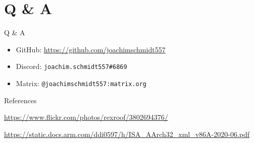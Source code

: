 \documentclass{beamer}
\begin{document}
\section{Q \& A}

\begin{frame}{Q \& A}
    \begin{itemize}
        \item GitHub: \url{https://github.com/joachimschmidt557}
        \item Discord: \texttt{joachim.schmidt557\#6869}
        \item Matrix: \texttt{@joachimschmidt557:matrix.org}
    \end{itemize}
\end{frame}

\begin{frame}{References}
    \begin{thebibliography}{}
    \url{https://www.flickr.com/photos/rexroof/3802694376/}
    
    \url{https://static.docs.arm.com/ddi0597/h/ISA_AArch32_xml_v86A-2020-06.pdf}
    
    \end{thebibliography}
\end{frame}
\end{document}
